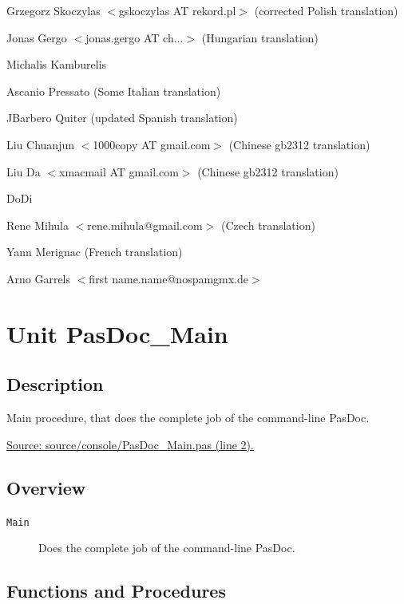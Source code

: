 \documentclass{report}
\newif\ifpdf
\begin{document}
\par
Grzegorz Skoczylas {$<$}gskoczylas AT rekord.pl{$>$} (corrected Polish translation)

\par
Jonas Gergo {$<$}jonas.gergo AT ch...{$>$} (Hungarian translation)

\par
Michalis Kamburelis

\par
Ascanio Pressato (Some Italian translation)

\par
JBarbero Quiter (updated Spanish translation)

\par
Liu Chuanjun {$<$}1000copy AT gmail.com{$>$} (Chinese gb2312 translation)

\par
Liu Da {$<$}xmacmail AT gmail.com{$>$} (Chinese gb2312 translation)

\par
DoDi

\par
Rene Mihula {$<$}rene.mihula@gmail.com{$>$} (Czech translation)

\par
Yann Merignac (French translation)

\par
Arno Garrels {$<$}first name.name@nospamgmx.de{$>$}

\chapter{Unit PasDoc{\_}Main}
\label{PasDoc_Main}
\section{Description}
Main procedure, that does the complete job of the command{-}line PasDoc.\par
\href{https://github.com/pasdoc/pasdoc/blob/master/source/console/PasDoc_Main.pas#L2}{Source: source/console/PasDoc{\_}Main.pas (line 2).}
\section{Overview}
\begin{description}
\item[\texttt{Main}]Does the complete job of the command{-}line PasDoc.
\end{description}
\section{Functions and Procedures}
\ifpdf
\end{document}
